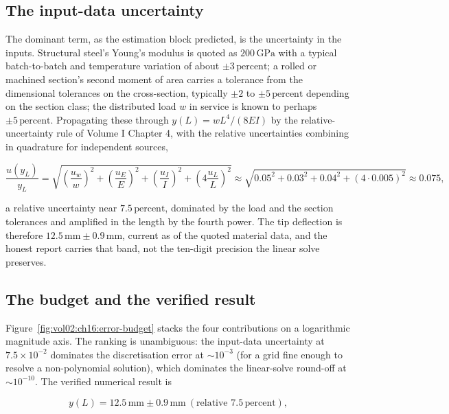 \subsection{The input-data uncertainty}

The dominant term, as the estimation block predicted, is the uncertainty in
the inputs. Structural steel's Young's modulus is quoted as $200\,\text{GPa}$
with a typical batch-to-batch and temperature variation of about $\pm 3\,
\text{percent}$; a rolled or machined section's second moment of area
carries a tolerance from the dimensional tolerances on the cross-section,
typically $\pm 2$ to $\pm 5\,\text{percent}$ depending on the section class;
the distributed load $w$ in service is known to perhaps $\pm 5\,\text{percent}$.
Propagating these through $y(L) = w L^{4}/(8 E I)$ by the
relative-uncertainty rule of Volume I Chapter 4, with the relative
uncertainties combining in quadrature for independent sources,

\[
\frac{u(y_{L})}{y_{L}} = \sqrt{\left(\frac{u_{w}}{w}\right)^{2} +
\left(\frac{u_{E}}{E}\right)^{2} + \left(\frac{u_{I}}{I}\right)^{2}
+ \left(4\frac{u_{L}}{L}\right)^{2}}
\approx \sqrt{0.05^{2} + 0.03^{2} + 0.04^{2} + (4 \cdot 0.005)^{2}}
\approx 0.075,
\]

a relative uncertainty near $7.5\,\text{percent}$, dominated by the load
and the section tolerances and amplified in the length by the fourth power.
The tip deflection is therefore $12.5\,\text{mm} \pm 0.9\,\text{mm}$,
current as of the quoted material data, and the honest report carries that
band, not the ten-digit precision the linear solve preserves.

\subsection{The budget and the verified result}



Figure~\ref{fig:vol02:ch16:error-budget} stacks the four contributions on
a logarithmic magnitude axis. The ranking is unambiguous: the input-data
uncertainty at $7.5 \times 10^{-2}$ dominates the discretisation error at
$\sim 10^{-3}$ (for a grid fine enough to resolve a non-polynomial
solution), which dominates the linear-solve round-off at $\sim 10^{-10}$.
The verified numerical result is

\[
y(L) = 12.5\,\text{mm} \pm 0.9\,\text{mm}\ (\text{relative } 7.5\,\text{percent}),
\]

